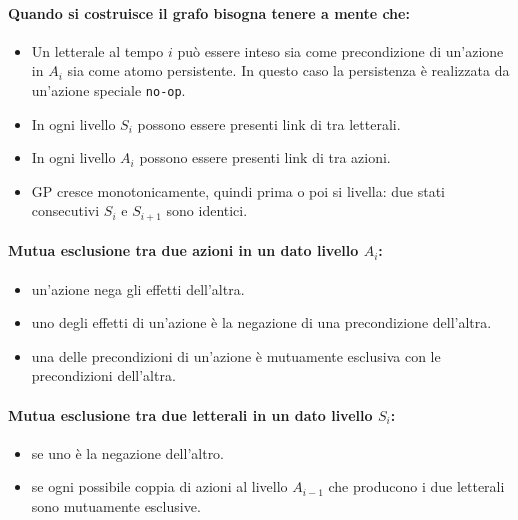 \paragraph{Quando si costruisce il grafo bisogna tenere a mente che:}

\begin{itemize}
  \item Un letterale al tempo $i$ può essere inteso sia come precondizione di un'azione in $A_i$ sia come atomo persistente. In questo caso la persistenza è realizzata da un'azione speciale \texttt{no-op}. 
  \item In ogni livello $S_i$ possono essere presenti link di  tra letterali. 
  \item In ogni livello $A_i$ possono essere presenti link di  tra azioni. 
  \item GP cresce monotonicamente, quindi prima o poi si livella: due stati consecutivi $S_i$ e $S_{i + 1}$ sono identici. 
\end{itemize}

\paragraph{Mutua esclusione tra due azioni in un dato livello $A_i$:}

\begin{itemize}
  \item {} un'azione nega gli effetti dell'altra. 
  \item {} uno degli effetti di un'azione è la negazione di una precondizione dell'altra. 
  \item {} una delle precondizioni di un'azione è mutuamente esclusiva con le precondizioni dell'altra. 
\end{itemize}

\paragraph{Mutua esclusione tra due letterali in un dato livello $S_i$:}

\begin{itemize}
  \item {} se uno è la negazione dell'altro. 
  \item {} se ogni possibile coppia di azioni al livello $A_{i - 1}$ che producono i due letterali sono mutuamente esclusive.
\end{itemize}

